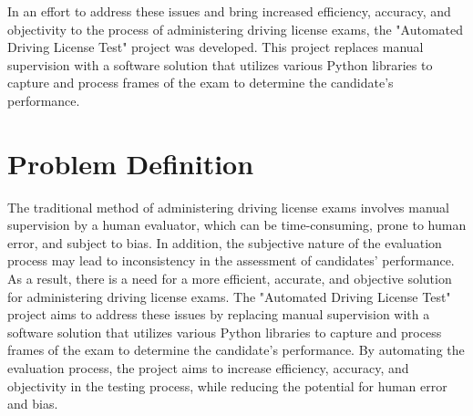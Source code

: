 In an effort to address these issues and bring increased efficiency, accuracy, and objectivity to the process of administering driving license exams, the "Automated Driving License Test" project was developed. This project replaces manual supervision with a software solution that utilizes various Python libraries to capture and process frames of the exam to determine the candidate's performance.

 
\section{Problem Definition}

The traditional method of administering driving license exams involves manual supervision by a human evaluator, which can be time-consuming, prone to human error, and subject to bias. In addition, the subjective nature of the evaluation process may lead to inconsistency in the assessment of candidates' performance. As a result, there is a need for a more efficient, accurate, and objective solution for administering driving license exams.
The "Automated Driving License Test" project aims to address these issues by replacing manual supervision with a software solution that utilizes various Python libraries to capture and process frames of the exam to determine the candidate's performance. By automating the evaluation process, the project aims to increase efficiency, accuracy, and objectivity in the testing process, while reducing the potential for human error and bias.


